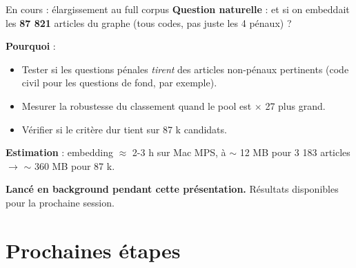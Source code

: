 \documentclass[aspectratio=169,10pt]{beamer}
\newcommand{\keybox}[1]{%
  \begin{center}
  \colorbox{accentsoft}{\parbox{0.92\linewidth}{\centering #1}}
  \end{center}}
\begin{document}
\begin{frame}{En cours : élargissement au full corpus}
  \small
  \textbf{Question naturelle} : et si on embeddait les \textbf{87 821} articles du graphe
  (tous codes, pas juste les 4 pénaux) ?

  \vspace{0.5em}
  \textbf{Pourquoi} :
  \begin{itemize}\setlength\itemsep{0.2em}
    \item Tester si les questions pénales \emph{tirent} des articles non-pénaux pertinents (code civil pour les questions de fond, par exemple).
    \item Mesurer la robustesse du classement quand le pool est $\times$ 27 plus grand.
    \item Vérifier si le critère dur tient sur 87 k candidats.
  \end{itemize}

  \vspace{0.5em}
  \textbf{Estimation} : embedding $\approx$ 2-3 h sur Mac MPS, à $\sim$ 12 MB pour 3 183 articles $\to$ $\sim$ 360 MB pour 87 k.

  \vspace{0.4em}
  \keybox{\textbf{Lancé en background pendant cette présentation.} Résultats disponibles
  pour la prochaine session.}
\end{frame}

\section{Prochaines étapes}
\end{document}
